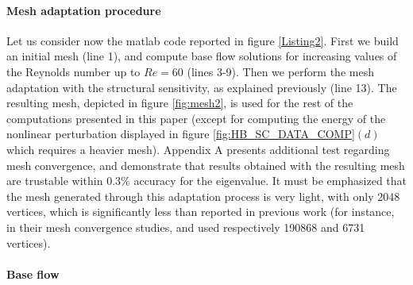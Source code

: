 \documentclass[twocolumn,10pt]{asme2ej}
\begin{document}
\paragraph{Mesh adaptation procedure}

Let us consider now the matlab code reported in figure \ref{Listing2}. First we build an initial mesh (line 1), and compute base flow solutions for increasing values of the Reynolds number up to $Re = 60$ (lines 3-9).
Then we perform the mesh adaptation with the structural sensitivity, as explained previously (line 13). 
The resulting mesh, depicted in figure \ref{fig:mesh2}, is used for the rest of the computations presented in this paper (except for computing
the energy of the nonlinear perturbation displayed in figure \ref{fig:HB_SC_DATA_COMP}$(d)$ which requires a heavier mesh). 
Appendix A presents additional test regarding mesh convergence, and demonstrate that results obtained with the resulting mesh are trustable within $0.3\%$ accuracy for the eigenvalue. It must be emphasized  that the mesh generated through this adaptation process is very light, with only 2048 vertices, which is significantly less than reported in previous work (for instance, in their mesh convergence studies, \cite{SippLebedev} and \cite{MLugo2014} used respectively 190868  and 6731 vertices).










\paragraph{Base flow}
\end{document}
